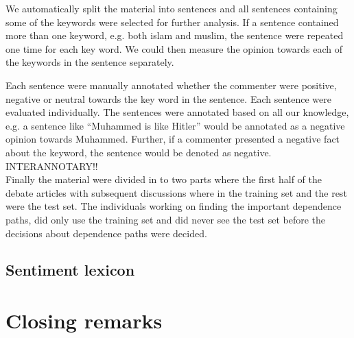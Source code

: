 \documentclass[11pt]{article}
\begin{document}
We automatically split the material into sentences and all sentences containing some of the keywords were selected for further analysis. If a sentence contained more than one keyword, e.g. both islam and muslim, the sentence were repeated one time for each key word. We could then measure the opinion towards each of the keywords in the sentence separately. 

Each sentence were manually annotated whether the commenter were positive, negative or neutral towards the key word in the sentence. Each sentence were evaluated individually. The sentences were annotated based on all our knowledge, e.g. a sentence like ``Muhammed is like Hitler'' would be annotated as a negative opinion towards Muhammed. Further, if a commenter presented a negative fact about the keyword, the sentence would be denoted as negative.\\
INTERANNOTARY!!\\
Finally the material were divided in to two parts where the first half of the debate articles with subsequent discussions where in the training set and the rest were the test set. The individuals working on finding the important dependence paths, did only use the training set and did never see the test set before the decisions about dependence paths were decided.

\subsection{Sentiment lexicon}





\section{Closing remarks}
\label{sec:cr}


\end{document}
